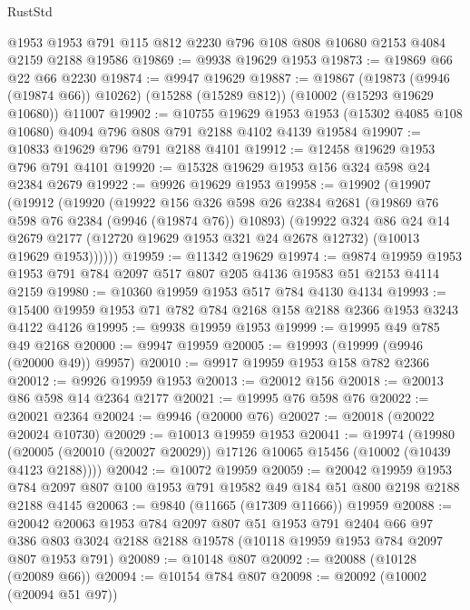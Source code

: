 \begin{lexlean}{RustStd}
\begin{coremodule}
    @1953
    @1953
    @791
    @115
    @812
    @2230
    @796
    @108
    @808
    @10680
    @2153
    @4084
    @2159
    @2188
    @19586
@19869 := @9938 @19629 @1953
@19873 := @19869 @66 @22 @66 @2230
@19874 := @9947 @19629
@19887 := @19867
    (@19873 (@9946 (@19874 @66)) @10262)
    (@15288 (@15289 @812))
    (@10002 (@15293 @19629 @10680))
    @11007
@19902 := @10755
    @19629
    @1953
    @1953
    (@15302 @4085 @108 @10680)
    @4094
    @796
    @808
    @791
    @2188
    @4102
    @4139
    @19584
@19907 := @10833 @19629 @796 @791 @2188 @4101
@19912 := @12458 @19629 @1953 @796 @791 @4101
@19920 := @15328 @19629 @1953 @156 @324 @598 @24 @2384 @2679
@19922 := @9926 @19629 @1953
@19958 := @19902
    (@19907
      (@19912
        (@19920
          (@19922
            @156
            @326
            @598
            @26
            @2384
            @2681
            (@19869 @76 @598 @76 @2384 (@9946 (@19874 @76)) @10893)
            (@19922
              @324
              @86
              @24
              @14
              @2679
              @2177
              (@12720 @19629 @1953 @321 @24 @2678 @12732)
              (@10013 @19629 @1953))))))
@19959 := @11342 @19629
@19974 := @9874 @19959 @1953 @1953 @791 @784 @2097 @517 @807 @205 @4136 @19583 @51 @2153 @4114 @2159
@19980 := @10360 @19959 @1953 @517 @784 @4130 @4134
@19993 := @15400 @19959 @1953 @71 @782 @784 @2168 @158 @2188 @2366 @1953 @3243 @4122 @4126
@19995 := @9938 @19959 @1953
@19999 := @19995 @49 @785 @49 @2168
@20000 := @9947 @19959
@20005 := @19993 (@19999 (@9946 (@20000 @49)) @9957)
@20010 := @9917 @19959 @1953 @158 @782 @2366
@20012 := @9926 @19959 @1953
@20013 := @20012 @156
@20018 := @20013 @86 @598 @14 @2364 @2177
@20021 := @19995 @76 @598 @76
@20022 := @20021 @2364
@20024 := @9946 (@20000 @76)
@20027 := @20018 (@20022 @20024 @10730)
@20029 := @10013 @19959 @1953
@20041 := @19974
    (@19980 (@20005 (@20010 (@20027 @20029)) @17126 @10065 @15456 (@10002 (@10439 @4123 @2188))))
@20042 := @10072 @19959
@20059 := @20042
    @19959
    @1953
    @784
    @2097
    @807
    @100
    @1953
    @791
    @19582
    @49
    @184
    @51
    @800
    @2198
    @2188
    @2188
    @4145
@20063 := @9840 (@11665 (@17309 @11666)) @19959
@20088 := @20042
    @20063
    @1953
    @784
    @2097
    @807
    @51
    @1953
    @791
    @2404
    @66
    @97
    @386
    @803
    @3024
    @2188
    @2188
    @19578
    (@10118 @19959 @1953 @784 @2097 @807 @1953 @791)
@20089 := @10148 @807
@20092 := @20088 (@10128 (@20089 @66))
@20094 := @10154 @784 @807
@20098 := @20092 (@10002 (@20094 @51 @97))

\end{coremodule}
\end{lexlean}
